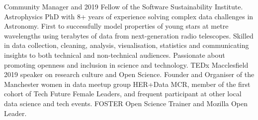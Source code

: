  \vspace{-6pt}

\begin{cvpubs}
  \cvpub
    {
      \begin{cvlist}
  \item {Community Manager and 2019 Fellow of the Software Sustainability Institute. Astrophysics PhD with 8+ years of experience solving complex data challenges in Astronomy. First to successfully model properties of young stars at metre wavelengths using terabytes of data from next-generation radio telescopes. Skilled in data collection, cleaning, analysis, visualisation, statistics and communicating insights to both technical and non-technical audiences. Passionate about promoting openness and inclusion in science and technology. TEDx Macclesfield 2019 speaker on research culture and Open Science. Founder and Organiser of the Manchester women in data meetup group HER+Data MCR, member of the first cohort of Tech Future Female Leaders, and frequent participant at other local data science and tech events. FOSTER Open Science Trainer and Mozilla Open Leader.}
      \end{cvlist}
    }
\end{cvpubs}

